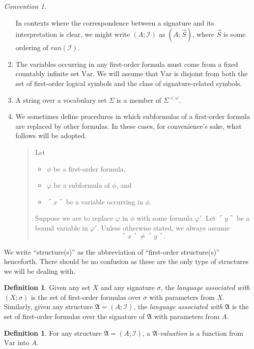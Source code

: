 \documentclass[12pt, twoside]{memoir}
\numberwithin{equation}{section}
\theoremstyle{definition}
\newtheorem{defi}[thm]{Definition}
\theoremstyle{remark}
\newtheorem{con}[thm]{Convention}
\theoremstyle{definition}
\theoremstyle{definition}
\theoremstyle{definition}
\theoremstyle{remark}
\begin{document}
\begin{con}
\begin{enumerate}[label=(\arabic*)]
    In contexts where the correspondence between a signature and its interpretation is clear, we might write $(A; \mathcal{I})$ as $(A; \Vec{S})$, where $\Vec{S}$ is some ordering of $ran(\mathcal{I})$.
    \item\label{224} The variables occurring in any first-order formula must come from a fixed countably infinite set $\mathrm{Var}$. We will assume that $\mathrm{Var}$ is disjoint from both the set of first-order logical symbols and the class of signature-related symbols.
    \item A string over a vocabulary set $\Sigma$ is a member of $\Sigma^{< \omega}$.
    \item We sometimes define procedures in which subformulas of a first-order formula are replaced by other formulas. In these cases, for convenience's sake, what follows will be adopted.
    \begin{quote}
        Let 
        \begin{itemize}
            \item $\phi$ be a first-order formula, 
            \item $\varphi$ be a subformula of $\phi$, and
            \item $\ulcorner x \urcorner$ be a variable occurring in $\phi$.
        \end{itemize}
        Suppose we are to replace $\varphi$ in $\phi$ with some formula $\varphi'$. Let $\ulcorner y \urcorner$ be a bound variable in $\varphi'$. Unless otherwise stated, we always assume $$\ulcorner x \urcorner \neq \ulcorner y \urcorner \text{.}$$        
    \end{quote}
\end{enumerate}
\end{con}

We write ``structure(s)'' as the abbreviation of ``first-order structure(s)'' henceforth. There should be no confusion as these are the only type of structures we will be dealing with.

\begin{defi}
Given any set $X$ and any signature $\sigma$, the \emph{language associated with} $(X; \sigma)$ is the set of first-order formulas over $\sigma$ with parameters from $X$. Similarly, given any structure $\mathfrak{A} = (A; \mathcal{I})$, the \emph{language associated with} $\mathfrak{A}$ is the set of first-order formulas over the signature of $\mathfrak{A}$ with parameters from $A$.
\end{defi}

\begin{defi}
For any structure $\mathfrak{A} = (A; \mathcal{I})$, a $\mathfrak{A}$\emph{-valuation} is a function from $\mathrm{Var}$ into $A$.
\end{defi}
\end{document}
